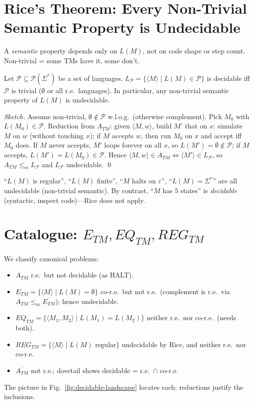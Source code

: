 \section{Rice's Theorem: Every Non-Trivial Semantic Property is Undecidable}
\label{sec:rice}
A \emph{semantic} property depends only on $L(M)$, not on code shape or step count. Non-trivial = some TMs have it, some don't.

\begin{theorem}[Rice, 1953]
Let $\mathcal{P}\subseteq\mathcal{P}(\Sigma^*)$ be a set of languages. $L_{\mathcal{P}}=\{\langle M\rangle\mid L(M)\in\mathcal{P}\}$ is decidable iff $\mathcal{P}$ is trivial ($\emptyset$ or all r.e.\ languages). In particular, any non-trivial semantic property of $L(M)$ is undecidable.
\end{theorem}
\begin{proof}[Sketch]
Assume non-trivial, $\emptyset\notin\mathcal{P}$ w.l.o.g.\ (otherwise complement). Pick $M_0$ with $L(M_0)\in\mathcal{P}$. Reduction from $A_{TM}$: given $\langle M,w\rangle$, build $M'$ that on $x$: simulate $M$ on $w$ (without touching $x$); if $M$ accepts $w$, then run $M_0$ on $x$ and accept iff $M_0$ does. If $M$ never accepts, $M'$ loops forever on all $x$, so $L(M')=\emptyset\notin\mathcal{P}$; if $M$ accepts, $L(M')=L(M_0)\in\mathcal{P}$. Hence $\langle M,w\rangle\in A_{TM}\iff\langle M'\rangle\in L_{\mathcal{P}}$, so $A_{TM}\le_m L_{\mathcal{P}}$ and $L_{\mathcal{P}}$ undecidable. \qed
\end{proof}

\begin{example}
``$L(M)$ is regular'', ``$L(M)$ finite'', ``$M$ halts on $\varepsilon$'', ``$L(M)=\Sigma^*$'' are all undecidable (non-trivial semantic). By contrast, ``$M$ has $5$ states'' is \emph{decidable} (syntactic, inspect code)---Rice does not apply.
\end{example}

\section{Catalogue: $E_{TM},EQ_{TM},REG_{TM}$}
\label{sec:catalogue}
We classify canonical problems:
\begin{itemize}[leftmargin=1.2em]
    \item $A_{TM}$ r.e.\ but not decidable (as HALT).
    \item $E_{TM}=\{\langle M\rangle\mid L(M)=\emptyset\}$ co-r.e.\ but not r.e.\ (complement is r.e.\ via $A_{TM}\le_m\overline{E_{TM}}$); hence undecidable.
    \item $EQ_{TM}=\{\langle M_1,M_2\rangle\mid L(M_1)=L(M_2)\}$ neither r.e.\ nor co-r.e.\ (needs both).
    \item $REG_{TM}=\{\langle M\rangle\mid L(M)\text{ regular}\}$ undecidable by Rice, and neither r.e.\ nor co-r.e.
    \item $\overline{A_{TM}}$ not r.e.; dovetail shows decidable = r.e.\ $\cap$ co-r.e.
\end{itemize}
The picture in Fig.~\ref{fig:decidable-landscape} locates each; reductions justify the inclusions.

